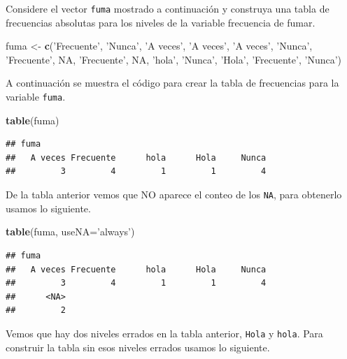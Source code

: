 \documentclass[10pt,]{krantz}
\makeatletter
\newenvironment{Shaded}{\begin{snugshade}}{\end{snugshade}}
\newcommand{\KeywordTok}[1]{\textcolor[rgb]{0.13,0.29,0.53}{\textbf{#1}}}
\newcommand{\DataTypeTok}[1]{\textcolor[rgb]{0.13,0.29,0.53}{#1}}
\newcommand{\StringTok}[1]{\textcolor[rgb]{0.31,0.60,0.02}{#1}}
\newcommand{\OtherTok}[1]{\textcolor[rgb]{0.56,0.35,0.01}{#1}}
\newcommand{\NormalTok}[1]{#1}
\newenvironment{kframe}{%
\medskip{}
\setlength{\fboxsep}{.8em}
 \def\at@end@of@kframe{}%
 \ifinner\ifhmode%
  \def\at@end@of@kframe{\end{minipage}}%
  \begin{minipage}{\columnwidth}%
 \fi\fi%
 \def\FrameCommand##1{\hskip\@totalleftmargin \hskip-\fboxsep
 \colorbox{shadecolor}{##1}\hskip-\fboxsep
     \hskip-\linewidth \hskip-\@totalleftmargin \hskip\columnwidth}%
 \MakeFramed {\advance\hsize-\width
   \@totalleftmargin\z@ \linewidth\hsize
   \@setminipage}}%
 {\par\unskip\endMakeFramed%
 \at@end@of@kframe}
\renewenvironment{Shaded}{\begin{kframe}}{\end{kframe}}
\makeatother
\begin{document}
Considere el vector \texttt{fuma} mostrado a continuación y construya
una tabla de frecuencias absolutas para los niveles de la variable
frecuencia de fumar.

\begin{Shaded}
\begin{Highlighting}[]
\NormalTok{fuma <-}\StringTok{ }\KeywordTok{c}\NormalTok{(}\StringTok{'Frecuente'}\NormalTok{, }\StringTok{'Nunca'}\NormalTok{, }\StringTok{'A veces'}\NormalTok{, }\StringTok{'A veces'}\NormalTok{, }\StringTok{'A veces'}\NormalTok{,}
          \StringTok{'Nunca'}\NormalTok{, }\StringTok{'Frecuente'}\NormalTok{, }\OtherTok{NA}\NormalTok{, }\StringTok{'Frecuente'}\NormalTok{, }\OtherTok{NA}\NormalTok{, }\StringTok{'hola'}\NormalTok{, }
          \StringTok{'Nunca'}\NormalTok{, }\StringTok{'Hola'}\NormalTok{, }\StringTok{'Frecuente'}\NormalTok{, }\StringTok{'Nunca'}\NormalTok{)}
\end{Highlighting}
\end{Shaded}

A continuación se muestra el código para crear la tabla de frecuencias
para la variable \texttt{fuma}.

\begin{Shaded}
\begin{Highlighting}[]
\KeywordTok{table}\NormalTok{(fuma)}
\end{Highlighting}
\end{Shaded}

\begin{verbatim}
## fuma
##   A veces Frecuente      hola      Hola     Nunca 
##         3         4         1         1         4
\end{verbatim}

De la tabla anterior vemos que NO aparece el conteo de los \texttt{NA},
para obtenerlo usamos lo siguiente.

\begin{Shaded}
\begin{Highlighting}[]
\KeywordTok{table}\NormalTok{(fuma, }\DataTypeTok{useNA=}\StringTok{'always'}\NormalTok{)}
\end{Highlighting}
\end{Shaded}

\begin{verbatim}
## fuma
##   A veces Frecuente      hola      Hola     Nunca 
##         3         4         1         1         4 
##      <NA> 
##         2
\end{verbatim}

Vemos que hay dos niveles errados en la tabla anterior, \texttt{Hola} y
\texttt{hola}. Para construir la tabla sin esos niveles errados usamos
lo siguiente.
\end{document}
